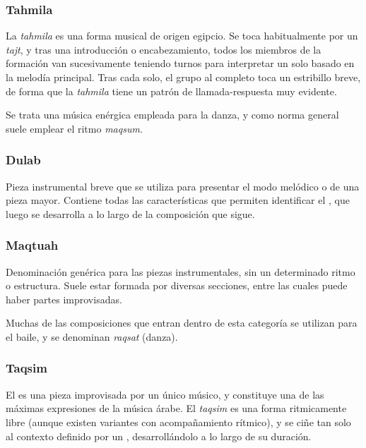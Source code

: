     \subsubsection{Tahmila}

        La \emph{tahmila} es una forma musical de origen egipcio. Se toca habitualmente por un \emph{tajt}, y tras una introducción o encabezamiento, todos los miembros de la formación van sucesivamente teniendo turnos para interpretar un solo basado en la melodía principal. Tras cada solo, el grupo al completo toca un estribillo breve, de forma que la \emph{tahmila} tiene un patrón de llamada-respuesta muy evidente.

        Se trata una música enérgica empleada para la danza, y como norma general suele emplear el ritmo \emph{maqsum}.


    \subsubsection{Dulab}

        Pieza instrumental breve que se utiliza para presentar el modo melódico o \maqam de una pieza mayor. Contiene todas las características que permiten identificar el \maqam, que luego se desarrolla a lo largo de la composición que sigue.


    \subsubsection{Maqtuah}

        Denominación genérica para las piezas instrumentales, sin un determinado ritmo o estructura. Suele estar formada por diversas secciones, entre las cuales puede haber partes improvisadas.

        Muchas de las composiciones que entran dentro de esta categoría se utilizan para el baile, y se denominan \emph{raqsat} (danza).


    \subsubsection{Taqsim}

        El \taqsim es una pieza improvisada por un único músico, y constituye una de las máximas expresiones de la música árabe. El \emph{taqsim} es una forma ritmicamente libre (aunque existen variantes con acompañamiento rítmico), y se ciñe tan solo al contexto definido por un \maqam, desarrollándolo a lo largo de su duración.

